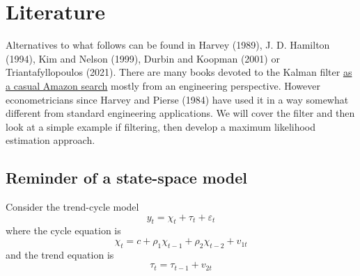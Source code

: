 \documentclass[
  letterpaper,
]{book}
\begin{document}
\hfill\break

\hypertarget{literature}{%
\section{Literature}\label{literature}}

Alternatives to what follows can be found in Harvey (1989), J. D.
Hamilton (1994), Kim and Nelson (1999), Durbin and Koopman (2001) or
Triantafyllopoulos (2021). There are many books devoted to the Kalman
filter
\href{https://www.amazon.co.uk/s?k=kalman+filtering\&i=stripbooks}{as a
casual Amazon search} mostly from an engineering perspective. However
econometricians since Harvey and Pierse (1984) have used it in a way
somewhat different from standard engineering applications. We will cover
the filter and then look at a simple example if filtering, then develop
a maximum likelihood estimation approach.

\hypertarget{reminder-of-a-state-space-model}{%
\subsection{Reminder of a state-space
model}\label{reminder-of-a-state-space-model}}

Consider the trend-cycle model \begin{equation}
  y_t = \chi_t + \tau_t + \varepsilon_t
\end{equation} where the cycle equation is \begin{equation}
  \chi_t = c+\rho_1 \chi_{t-1} + \rho_2 \chi_{t-2}+v_{1t}
\end{equation} and the trend equation is \begin{equation}
  \tau_t = \tau_{t-1} + v_{2t}
\end{equation}
\end{document}

